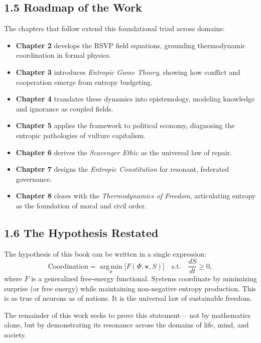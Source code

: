 \documentclass[11pt,a4paper,titlepage]{article}
\theoremstyle{definition}
\begin{document}
\subsection{1.5 Roadmap of the Work}

The chapters that follow extend this foundational triad across domains:

\begin{itemize}[leftmargin=2em]
  \item \textbf{Chapter 2} develops the RSVP field equations, grounding
  thermodynamic coordination in formal physics.
  \item \textbf{Chapter 3} introduces \emph{Entropic Game Theory}, showing how
  conflict and cooperation emerge from entropy budgeting.
  \item \textbf{Chapter 4} translates these dynamics into epistemology,
  modeling knowledge and ignorance as coupled fields.
  \item \textbf{Chapter 5} applies the framework to political economy,
  diagnosing the entropic pathologies of vulture capitalism.
  \item \textbf{Chapter 6} derives the \emph{Scavenger Ethic} as the universal
  law of repair.
  \item \textbf{Chapter 7} designs the \emph{Entropic Constitution} for
  resonant, federated governance.
  \item \textbf{Chapter 8} closes with the \emph{Thermodynamics of Freedom},
  articulating entropy as the foundation of moral and civil order.
\end{itemize}

\subsection{1.6 The Hypothesis Restated}

The hypothesis of this book can be written in a single expression:
\begin{equation}
\text{Coordination} = 
  \operatorname*{arg\,min}_{\mathbf{v}} \Big[ F(\Phi,\mathbf{v},S) \Big]
  \quad \text{s.t.} \quad \frac{dS}{dt} \ge 0,
\label{eq:coordination_hypothesis}
\end{equation}
where $F$ is a generalized free-energy functional.
Systems coordinate by minimizing surprise (or free energy)
while maintaining non-negative entropy production.
This is as true of neurons as of nations.
It is the universal law of sustainable freedom.

\bigskip
\noindent
The remainder of this work seeks to prove this statement—
not by mathematics alone, but by demonstrating its resonance across
the domains of life, mind, and society.
\end{document}
